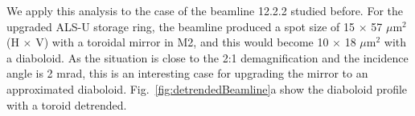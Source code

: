 \documentclass{iucr}              %
\begin{document}
% 



We apply this analysis to the case of the beamline 12.2.2 studied before. For the upgraded ALS-U storage ring, the beamline produced a spot size of 15 $\times$ 57 $\mu$m$^2$ (H $\times$ V) with a toroidal mirror in M2, and this would become 10 $\times$ 18 $\mu$m$^2$ with a diaboloid. As the situation is close to the 2:1 demagnification and the incidence angle is 2 mrad, this is an interesting case for upgrading the mirror to an approximated diaboloid. Fig.~\ref{fig:detrendedBeamline}a show the diaboloid profile with a toroid detrended. 
\end{document}
